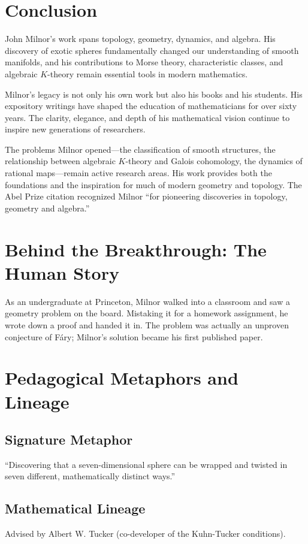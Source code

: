 \section{Conclusion}

John Milnor's work spans topology, geometry, dynamics, and algebra. His discovery of exotic spheres fundamentally changed our understanding of smooth manifolds, and his contributions to Morse theory, characteristic classes, and algebraic $K$-theory remain essential tools in modern mathematics.

Milnor's legacy is not only his own work but also his books and his students. His expository writings have shaped the education of mathematicians for over sixty years. The clarity, elegance, and depth of his mathematical vision continue to inspire new generations of researchers.

The problems Milnor opened---the classification of smooth structures, the relationship between algebraic $K$-theory and Galois cohomology, the dynamics of rational maps---remain active research areas. His work provides both the foundations and the inspiration for much of modern geometry and topology. The Abel Prize citation recognized Milnor ``for pioneering discoveries in topology, geometry and algebra.''

\section{Behind the Breakthrough: The Human Story}
As an undergraduate at Princeton, Milnor walked into a classroom and saw a geometry problem on the board. Mistaking it for a homework assignment, he wrote down a proof and handed it in. The problem was actually an unproven conjecture of F\'ary; Milnor's solution became his first published paper.

\section{Pedagogical Metaphors and Lineage}
\subsection{Signature Metaphor}
``Discovering that a seven-dimensional sphere can be wrapped and twisted in seven different, mathematically distinct ways.''

\subsection{Mathematical Lineage}
Advised by Albert W. Tucker (co-developer of the Kuhn-Tucker conditions).

